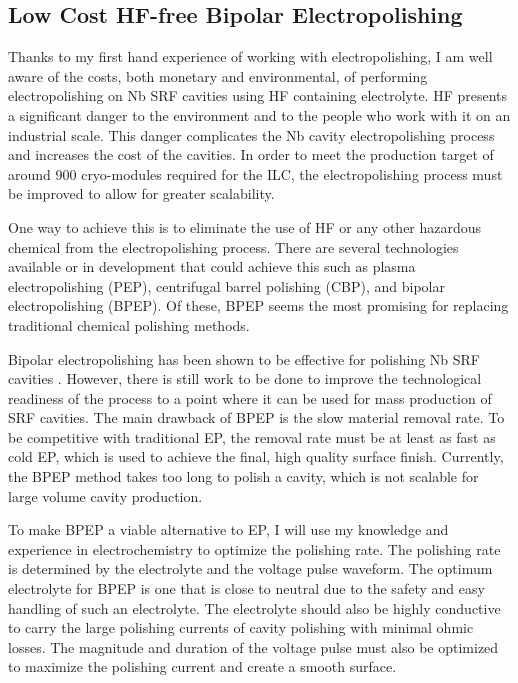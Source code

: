 \documentclass[]{revtex4-2}
\begin{document}
\subsection{Low Cost HF-free Bipolar Electropolishing}

    Thanks to my first hand experience of working with electropolishing, I am well aware of the costs, both monetary and environmental, of performing electropolishing on Nb SRF cavities using HF containing electrolyte. HF presents a significant danger to the environment and to the people who work with it on an industrial scale. This danger complicates the Nb cavity electropolishing process and increases the cost of the cavities. In order to meet the production target of around 900 cryo-modules required for the ILC, the electropolishing process must be improved to allow for greater scalability.

    One way to achieve this is to eliminate the use of HF or any other hazardous chemical from the electropolishing process. There are several technologies available or in development that could achieve this such as plasma electropolishing (PEP), centrifugal barrel polishing (CBP), and bipolar electropolishing (BPEP). Of these, BPEP seems the most promising for replacing traditional chemical polishing methods.

    Bipolar electropolishing has been shown to be effective for polishing Nb SRF cavities \cite{?}. However, there is still work to be done to improve the technological readiness of the process to a point where it can be used for mass production of SRF cavities. The main drawback of BPEP is the slow material removal rate. To be competitive with traditional EP, the removal rate must be at least as fast as cold EP, which is used to achieve the final, high quality surface finish. Currently, the BPEP method takes too long to polish a cavity, which is not scalable for large volume cavity production.

    To make BPEP a viable alternative to EP, I will use my knowledge and experience in electrochemistry to optimize the polishing rate. The polishing rate is determined by the electrolyte and the voltage pulse waveform. The optimum electrolyte for BPEP is one that is close to neutral due to the safety and easy handling of such an electrolyte. The electrolyte should also be highly conductive to carry the large polishing currents of cavity polishing with minimal ohmic losses. The magnitude and duration of the voltage pulse must also be optimized to maximize the polishing current and create a smooth surface.
\end{document}
